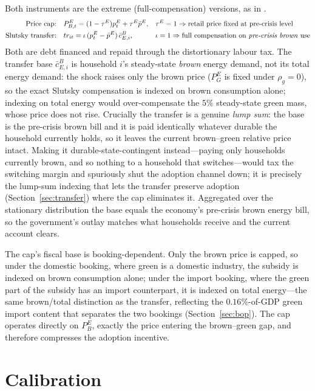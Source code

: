 \documentclass[11pt,a4paper]{article}
\begin{document}
Both instruments are the extreme (full-compensation) versions, as in
\citet{Bayer2026}.
\begin{align}
\text{Price cap:}\quad & P^{E}_{B,t}=(1-\tau^{E})p^{E}_{t}+\tau^{E}\bar p^{E},
&& \tau^{E}=1 \Rightarrow \text{retail price fixed at pre-crisis level}\\
\text{Slutsky transfer:}\quad & tr_{it}=\iota\,(p^{E}_{t}-\bar p^{E})\,\bar c^{B}_{E,i},
&& \iota=1 \Rightarrow \text{full compensation on \emph{pre-crisis brown} use}
\end{align}
Both are debt financed and repaid through the distortionary labour tax. The
transfer base $\bar c^{B}_{E,i}$ is household $i$'s steady-state \emph{brown}
energy demand, not its total energy demand: the shock raises only the brown
price ($P^{E}_{G}$ is fixed under $\rho_g=0$), so the exact Slutsky compensation
is indexed on brown consumption alone; indexing on total energy would
over-compensate the $5\%$ steady-state green mass, whose price does not rise.
Crucially the transfer is a genuine \emph{lump sum}: the base is the pre-crisis
brown bill and it is paid identically whatever durable the household currently
holds, so it leaves the current brown--green relative price intact. Making it
durable-state-contingent instead---paying only households currently brown, and
so nothing to a household that switches---would tax the switching margin and
spuriously shut the adoption channel down; it is precisely the lump-sum indexing
that lets the transfer preserve adoption (Section~\ref{sec:transfer}) where the
cap eliminates it. Aggregated over the stationary distribution the base equals
the economy's pre-crisis brown energy bill, so the government's outlay matches
what households receive and the current account clears.

The cap's fiscal base is booking-dependent. Only the brown price is capped, so
under the domestic booking, where green is a domestic industry, the subsidy is
indexed on brown consumption alone; under the import booking, where the green
part of the subsidy has an import counterpart, it is indexed on total
energy---the same brown/total distinction as the transfer, reflecting the
$0.16\%$-of-GDP green import content that separates the two bookings
(Section~\ref{sec:bop}). The cap operates directly on $P^{E}_{B}$, exactly the
price entering the brown--green gap, and therefore compresses the adoption
incentive.

\section{Calibration}
\end{document}
